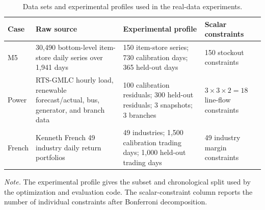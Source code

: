 \begin{table}[t]
\centering
\small
\caption{Data sets and experimental profiles used in the real-data experiments.}
\label{tab:data_profile}
\begin{tabularx}{\linewidth}{lYYY}
\toprule
Case & Raw source & Experimental profile & Scalar constraints \\
\midrule
M5 & 30,490 bottom-level item-store daily series over 1,941 days & 150 item-store series; 730 calibration days; 365 held-out days & 150 stockout constraints \\
Power & RTS-GMLC hourly load, renewable forecast/actual, bus, generator, and branch data & 100 calibration residuals; 300 held-out residuals; 3 snapshots; 3 branches & $3 \times 3 \times 2 = 18$ line-flow constraints \\
French & Kenneth French 49 industry daily return portfolios & 49 industries; 1,500 calibration trading days; 1,000 held-out trading days & 49 industry margin constraints \\
\bottomrule
\end{tabularx}
\vspace{2pt}
\begin{minipage}{.98\linewidth}
\footnotesize \textit{Note.} The experimental profile gives the subset and chronological split used by the optimization and evaluation code. The scalar-constraint column reports the number of individual constraints after Bonferroni decomposition.
\end{minipage}
\end{table}
